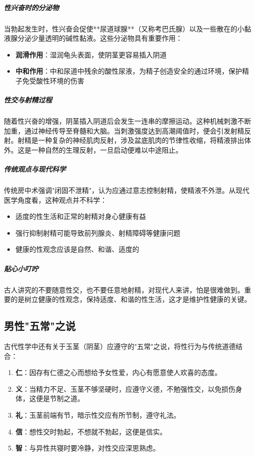 \subparagraph{性兴奋时的分泌物}

当勃起发生时，性兴奋会促使**尿道球腺**（又称考巴氏腺）以及一些散在的小黏液腺分泌少量透明的碱性黏液。这些分泌物具有重要作用：
\begin{itemize}
    \item \textbf{润滑作用}：湿润龟头表面，使阴茎更容易插入阴道
    \item \textbf{中和作用}：中和尿道中残余的酸性尿液，为精子创造安全的通过环境，保护精子免受酸性环境的伤害
\end{itemize}

\subparagraph{性交与射精过程}

随着性兴奋的增强，阴茎插入阴道后会发生一连串的摩擦运动。这种机械刺激不断加重，通过神经传导至脊髓和大脑。当刺激强度达到高潮阈值时，便会引发射精反射。射精是一种复杂的神经肌肉反射，涉及盆底肌肉的节律性收缩，将精液排出体外。这是一种自然的生理反射，一旦启动便难以中途阻止。

\subparagraph{传统观点与现代科学}

传统房中术强调"闭固不泄精"，认为应通过意志控制射精，使精液不外泄。从现代医学角度看，这种观点并不科学：
\begin{itemize}
    \item 适度的性生活和正常的射精对身心健康有益
    \item 强行抑制射精可能导致前列腺炎、射精障碍等健康问题
    \item 健康的性观念应该是自然、和谐、适度的
\end{itemize}

\subparagraph{贴心小叮咛}

古人讲究的不要随意性交，也不要任意地射精，对现代人来讲，怕是很难做到。重要的是树立健康的性观念，保持适度、和谐的性生活，这才是维护性健康的关键。

\subsection{男性"五常"之说}

古代性学中还有关于玉茎（阴茎）应遵守的"五常"之说，将性行为与传统道德结合：

\begin{enumerate}
    \item \textbf{仁}：因存有仁德之心而想给予女性爱，内心有愿意使人欢喜的态度。
    \item \textbf{义}：当精力不足、玉茎不够坚硬时，应遵守义德，不勉强性交，以免损伤身体，这便是节制之道。
    \item \textbf{礼}：玉茎前端有节，暗示性交应有所节制，遵守礼法。
    \item \textbf{信}：想性交时勃起，不想就不勃起，这便是信实。
    \item \textbf{智}：与异性共寝时要冷静，对性交应深思熟虑。
\end{enumerate}

